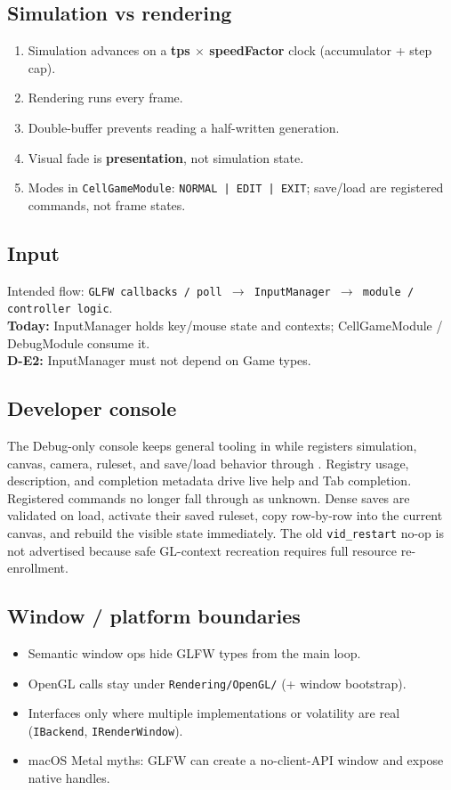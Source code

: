 \documentclass[10pt,a4paper]{article}
\begin{document}
\subsection{Simulation vs rendering}
\begin{enumerate}
    \item Simulation advances on a \textbf{tps $\times$ speedFactor} clock (accumulator + step cap).
    \item Rendering runs every frame.
    \item Double-buffer prevents reading a half-written generation.
    \item Visual fade is \textbf{presentation}, not simulation state.
    \item Modes in \texttt{CellGameModule}: \texttt{NORMAL | EDIT | EXIT}; save/load are registered commands, not frame states.
\end{enumerate}

\subsection{Input}
Intended flow: \texttt{GLFW callbacks / poll $\rightarrow$ InputManager $\rightarrow$ module / controller logic}.\\
\textbf{Today:} InputManager holds key/mouse state and contexts; CellGameModule / DebugModule consume it.\\
\textbf{D-E2:} InputManager must not depend on Game types.

\subsection{Developer console}
The Debug-only console keeps general tooling in  while
 registers simulation, canvas, camera, ruleset, and
save/load behavior through . Registry usage,
description, and completion metadata drive live help and Tab completion.
Registered commands no longer fall through as unknown. Dense saves are validated
on load, activate their saved ruleset, copy row-by-row into the current canvas,
and rebuild the visible state immediately. The old \texttt{vid\_restart} no-op is
not advertised because safe GL-context recreation requires full resource
re-enrollment.

\subsection{Window / platform boundaries}
\begin{itemize}
    \item Semantic window ops hide GLFW types from the main loop.
    \item OpenGL calls stay under \texttt{Rendering/OpenGL/} (+ window bootstrap).
    \item Interfaces only where multiple implementations or volatility are real (\texttt{IBackend}, \texttt{IRenderWindow}).
    \item macOS Metal myths: GLFW can create a no-client-API window and expose native handles.
\end{itemize}
\end{document}
